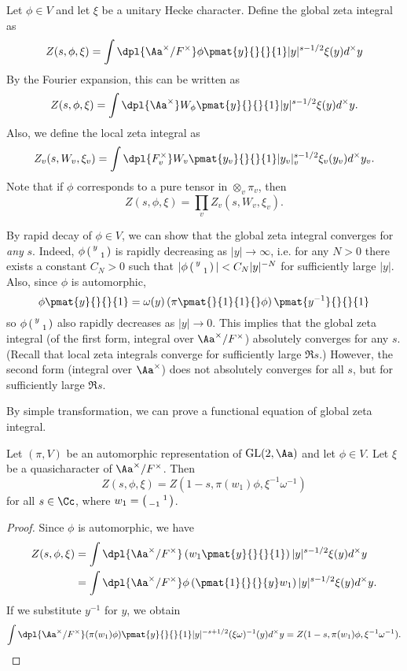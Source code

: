 \begin{definition}
Let $\phi\in V$ and let $\xi$ be a unitary Hecke character. Define the global zeta integral as
$$
Z(s, \phi, \xi) = \int\dpl{\Aa^{\times}/F^{\times}} \phi\pmat{y}{}{}{1} |y|^{s-1/2} \xi(y) d^{\times}y
$$
By the Fourier expansion, this can be written as
$$
Z(s, \phi, \xi) = \int\dpl{\Aa^{\times}} W_{\phi}\pmat{y}{}{}{1} |y|^{s-1/2} \xi(y) d^{\times}y. 
$$
Also, we define the local zeta integral as 
$$
Z_{v}(s, W_{v}, \xi_{v}) = \int\dpl{F_{v}^{\times}} W_{v}\pmat{y_{v}}{}{}{1} |y_{v}|_{v}^{s-1/2} \xi_{v}(y_{v})d^{\times}y_{v}. 
$$
Note that if $\phi$ corresponds to a pure tensor in $\otimes_{v}\pi_{v}$, then 
$$
Z(s, \phi, \xi) =\prod_{v} Z_{v}(s, W_{v}, \xi_{v}). 
$$
\end{definition}
By rapid decay of $\phi\in V$, we can show that the global zeta integral converges for \emph{any} $s$. 
Indeed, $\phi\left(\begin{smallmatrix} y &  \\  & 1 \end{smallmatrix}\right)$ is rapidly decreasing as $|y| \to \infty$, i.e. for any $N>0$ there exists a constant $C_N>0$ such that $|\phi\left(\begin{smallmatrix} y &  \\  & 1 \end{smallmatrix}\right)| < C_{N}|y|^{-N}$ for sufficiently large $|y|$. 
Also, since $\phi$ is automorphic, 
$$
\phi\pmat{y}{}{}{1} = \omega(y) \left( \pi \pmat{}{1}{1}{} \phi\right) \pmat{y^{-1}}{}{}{1}
$$
so $\phi\left(\begin{smallmatrix} y &  \\  & 1 \end{smallmatrix}\right)$ also rapidly decreases as $|y|\to 0$. 
This implies that the global zeta integral (of the first form, integral over $\Aa^{\times} / F^{\times}$) absolutely converges for any $s$. (Recall that local zeta integrals converge for sufficiently large $\Re s$.) However, the second form (integral over $\Aa^{\times}$) does not absolutely converges for all $s$, but for sufficiently large $\Re s$. 

By simple transformation, we can prove a functional equation of global zeta integral. 
\begin{proposition}
Let $(\pi, V)$ be an automorphic representation of $\GL(2, \Aa)$ and let $\phi \in V$. 
Let $\xi$ be a quasicharacter of $\Aa^{\times}/F^{\times}$. 
Then 
$$
Z(s, \phi, \xi) = Z(1-s, \pi(w_1)\phi, \xi^{-1} \omega^{-1})
$$
for all $s\in \Cc$, where $w_1 = \left(\begin{smallmatrix}  & 1 \\ -1 &  \end{smallmatrix}\right)$. 
\end{proposition}
\begin{proof}
Since $\phi$ is automorphic, we have
\begin{align*}
Z(s, \phi, \xi) &= \int\dpl{\Aa^{\times}/F^{\times}} \left( w_1 \pmat{y}{}{}{1} \right) |y|^{s-1/2} \xi(y)d^{\times} y \\
&= \int\dpl{\Aa^{\times}/F^{\times}} \phi\left( \pmat{1}{}{}{y} w_{1}\right) |y|^{s-1/2} \xi(y) d^{\times} y.
\end{align*}
If we substitute $y^{-1}$ for $y$, we obtain
$$
\int\dpl{\Aa^{\times}/F^{\times}} (\pi(w_1)\phi)\pmat{y}{}{}{1} |y|^{-s+1/2} (\xi \omega)^{-1}(y)d^{\times}y = Z(1-s, \pi(w_1)\phi, \xi^{-1}\omega^{-1}). 
$$
\end{proof}
 
